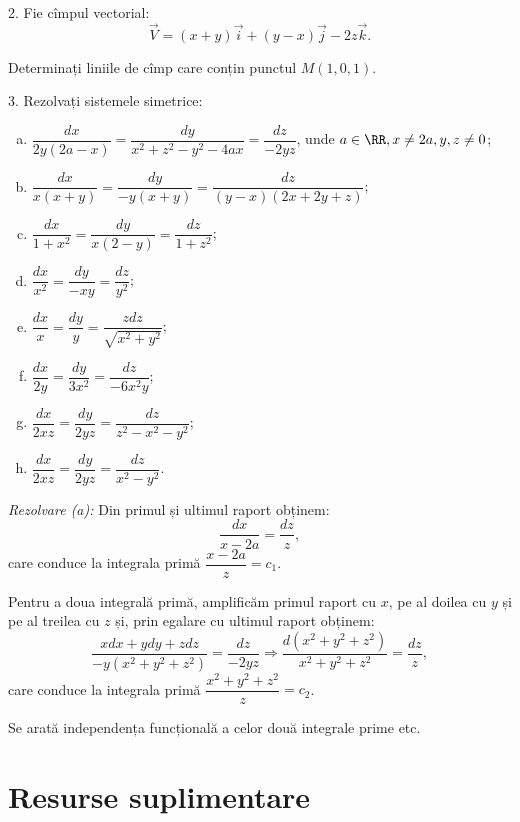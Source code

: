 \vspace{0.3cm}

2. Fie cîmpul vectorial:
\[
  \vec{V} = (x + y)\vec{i} + (y - x)\vec{j} - 2z\vec{k}.
\]

Determinați liniile de cîmp care conțin punctul $ M(1, 0, 1) $.

\vspace{0.3cm}

3. Rezolvați sistemele simetrice:
\begin{enumerate}[(a)]
    \item $ \dfrac{dx}{2y(2a - x)} = \dfrac{dy}{x^2 + z^2 - y^2 - 4ax} = \dfrac{dz}{-2yz} $,
        unde $ a \in \RR, x \neq 2a, y, z \neq 0 $;
    \item $ \dfrac{dx}{x(x + y)} = \dfrac{dy}{-y(x + y)} = \dfrac{dz}{(y - x)(2x + 2y + z)} $;
    \item $ \dfrac{dx}{1 + x^2} = \dfrac{dy}{x(2 - y)} = \dfrac{dz}{1 + z^2} $;
    \item $ \dfrac{dx}{x^2} = \dfrac{dy}{-xy} = \dfrac{dz}{y^2} $;
    \item $ \dfrac{dx}{x} = \dfrac{dy}{y} = \dfrac{zdz}{\sqrt{x^2 + y^2}} $;
    \item $ \dfrac{dx}{2y} = \dfrac{dy}{3x^2} = \dfrac{dz}{-6x^2y} $;
    \item $ \dfrac{dx}{2xz} = \dfrac{dy}{2yz} = \dfrac{dz}{z^2 - x^2 - y^2} $;
    \item $ \dfrac{dx}{2xz} = \dfrac{dy}{2yz} = \dfrac{dz}{x^2 - y^2} $.
\end{enumerate}

{
    \color{blue}
    \emph{Rezolvare (a):} Din primul și ultimul raport obținem:
    \[
        \dfrac{dx}{x - 2a} = \dfrac{dz}{z},
    \]
    care conduce la integrala primă $ \dfrac{x - 2a}{z} = c_1 $.

    Pentru a doua integrală primă, amplificăm primul raport cu $ x $,
    pe al doilea cu $ y $ și pe al treilea cu $ z $ și, prin egalare cu 
    ultimul raport obținem:
    \[
        \dfrac{xdx + ydy + zdz}{-y(x^2 + y^2 + z^2)} = \dfrac{dz}{-2yz} \Longrightarrow %
        \dfrac{d(x^2 + y^2 + z^2)}{x^2 + y^2 + z^2} = \dfrac{dz}{z},
    \]
    care conduce la integrala primă $ \dfrac{x^2 + y^2 + z^2}{z} = c_2 $.

    Se arată independența funcțională a celor două integrale prime etc.
}


\section{Resurse suplimentare}


